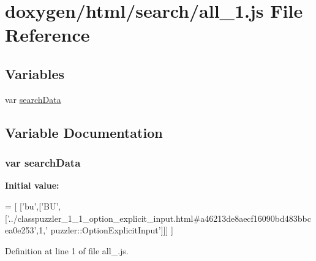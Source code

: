 \hypertarget{a00041}{}\section{doxygen/html/search/all\+\_\+1.js File Reference}
\label{a00041}
\subsection*{Variables}
\begin{DoxyCompactItemize}
\item 
var \hyperlink{a00041_ad01a7523f103d6242ef9b0451861231e}{search\+Data}
\end{DoxyCompactItemize}


\subsection{Variable Documentation}
\hypertarget{a00041_ad01a7523f103d6242ef9b0451861231e}{}
\subsubsection[{search\+Data}]{\setlength{\rightskip}{0pt plus 5cm}var search\+Data}\label{a00041_ad01a7523f103d6242ef9b0451861231e}
{\bfseries Initial value\+:}
\begin{DoxyCode}
=
[
  [\textcolor{stringliteral}{'bu'},[\textcolor{stringliteral}{'BU'},[\textcolor{stringliteral}{'../classpuzzler\_1\_1\_option\_explicit\_input.html#a46213de8aecf16090bd483bbcea0e253'},1,\textcolor{stringliteral}{'
      puzzler::OptionExplicitInput'}]]]
]
\end{DoxyCode}


Definition at line 1 of file all\+\_.\+js.

